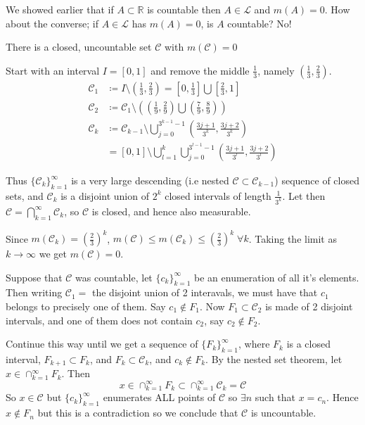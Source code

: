 We showed earlier that if $A \subset \mathbb{R}$ is countable then $A \in \mathcal{L}$ and $m(A) = 0$.
How about the converse;
if $A \in \mathcal{L}$ has $m(A) = 0$, is $A$ countable?
No!

\begin{theorem}[Cantor]
    There is a closed, uncountable set $\mathcal{C}$ with $m(\mathcal{C}) = 0$
\end{theorem}

Start with an interval $I = [0,1]$ and remove the middle $\frac{1}{3}$, namely $(\frac{1}{3}, \frac{2}{3})$.
\begin{align*}
    \mathcal{C}_1 &\coloneqq I \setminus \left(  \frac{1}{3}, \frac{2}{3} \right)  = \left[ 0, \frac{1}{3} \right] \bigcup \left[ \frac{2}{3}, 1 \right] \\
    \mathcal{C}_2 &\coloneqq  \mathcal{C}_1 \setminus \left( \left( \frac{1}{9}, \frac{2}{9} \right) \bigcup  \left( \frac{7}{9}, \frac{8}{9} \right) \right) \\
    \mathcal{C}_k &\coloneqq  \mathcal{C}_{k-1} \setminus \bigcup_{j=0}^{3^{k-1}-1} \left( \frac{3j + 1}{3^k} , \frac{3j + 2}{3^k}\right) \\
    &= [0,1] \setminus \bigcup_{l=1}^{k} \bigcup_{j=0}^{3^{l-1}-1} \left( \frac{3j + 1}{3^l} , \frac{3j + 2}{3^l}\right)
\end{align*}

Thus $\{ \mathcal{C}_k \}_{k=1}^{\infty}$ is a very large descending (i.e nested $\mathcal{C} \subset \mathcal{C}_{k-1}$) sequence of closed sets, and $\mathcal{C}_k$ is a disjoint union of $2^k$ closed intervals of length $\frac{1}{3^k}$.
Let then $\mathcal{C} = \bigcap_{k=1}^{\infty} \mathcal{C}_k$, so $\mathcal{C}$ is closed, and hence also measurable.

Since $m(\mathcal{C}_k) = \left( \frac{2}{3} \right)^k$, $m(\mathcal{C}) \leq m(\mathcal{C}_k) \leq \left( \frac{2}{3} \right)^k \; \forall k$.
Taking the limit as $k \rightarrow \infty$ we get $m(\mathcal{C}) = 0$.

Suppose that $\mathcal{C}$ was countable, let $\{ c_k \}_{k=1}^{\infty}$ be an enumeration of all it's elements.
Then writing $\mathcal{C}_1 = $ the disjoint union of 2 interavals, we must have that $c_1$ belongs to precisely one of them.
Say $c_1 \notin F_1$.
Now $F_1 \subset \mathcal{C}_2$ is made of 2 disjoint intervals, and one of them does not contain $c_2$, say $c_2 \notin F_2$.

Continue this way until we get a sequence of $\{ F_k \} _{k=1}^{\infty}$, where $F_k$ is a closed interval, $F_{k+1} \subset F_k$, and $F_k \subset \mathcal{C}_k$, and $c_k \notin F_k$.
By the nested set theorem, let $x \in \cap _{k=1}^{\infty} F_k$.
Then
\[
    x \in \cap _{k=1}^{\infty} F_k \subset \cap _{k=1}^{\infty} \mathcal{C}_k = \mathcal{C}
\]
So $x \in \mathcal{C}$ but $\{ c_k \}_{k=1}^{\infty}$ enumerates ALL points of $\mathcal{C}$ so $\exists n$ such that $x = c_n$.
Hence $x \notin F_n$ but this is a contradiction so we conclude that $\mathcal{C}$ is uncountable.

